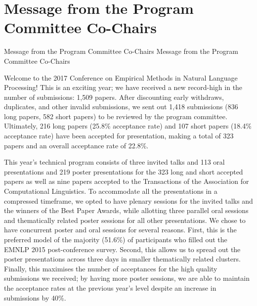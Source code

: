 \section{Message from the Program Committee Co-Chairs}
\setheaders%
    {Message from the Program Committee Co-Chairs}%
    {Message from the Program Committee Co-Chairs}
\thispagestyle{emptyheader}

\setlength{\parskip}{.7ex}

Welcome to the 2017 Conference on Empirical Methods in Natural Language Processing! This is an exciting year; we have received a new record-high in the number of submissions: 1,509 papers. After discounting early withdraws, duplicates, and other invalid submissions, we sent out 1,418 submissions (836 long papers, 582 short papers) to be reviewed by the program committee. Ultimately, 216 long papers (25.8\% acceptance rate) and 107 short papers (18.4\% acceptance rate) have been accepted for presentation, making a total of 323 papers and an overall acceptance rate of 22.8\%. 

This year’s technical program consists of three invited talks and 113 oral presentations and 219 poster presentations for the 323 long and short accepted papers as well as nine papers accepted to the Transactions of the Association for Computational Linguistics. To accommodate all the presentations in a compressed timeframe, we opted to have plenary sessions for the invited talks and the winners of the Best Paper Awards, while allotting three parallel oral sessions and thematically related poster sessions for all other presentations. We chose to have concurrent poster and oral sessions for several reasons. First, this is the preferred model of the majority (51.6\%) of participants who filled out the EMNLP 2015 post-conference survey. Second, this allows us to spread out the poster presentations across three days in smaller thematically related clusters. Finally, this maximises the number of acceptances for the high quality submissions we received; by having more poster sessions, we are able to maintain the acceptance rates at the previous year’s level despite an increase in submissions by 40\%. 

